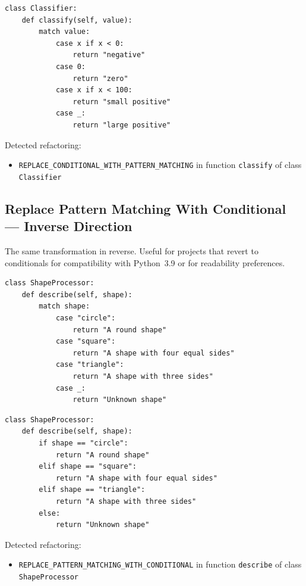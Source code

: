 \documentclass[11pt,a4paper]{article}
\newcommand{\code}[1]{\texttt{#1}}
\begin{document}
\begin{lstlisting}[caption={After: \texttt{match} with guard clauses.}]
class Classifier:
    def classify(self, value):
        match value:
            case x if x < 0:
                return "negative"
            case 0:
                return "zero"
            case x if x < 100:
                return "small positive"
            case _:
                return "large positive"
\end{lstlisting}

Detected refactoring:
\begin{itemize}[leftmargin=*]
  \item \code{REPLACE\_CONDITIONAL\_WITH\_PATTERN\_MATCHING} in function \code{classify} of class \code{Classifier}
\end{itemize}

\subsection{Replace Pattern Matching With Conditional --- Inverse Direction}

The same transformation in reverse. Useful for projects that revert to conditionals for compatibility with Python~3.9 or for readability preferences.

\begin{lstlisting}[caption={Before: \texttt{match}/\texttt{case} dispatch.}]
class ShapeProcessor:
    def describe(self, shape):
        match shape:
            case "circle":
                return "A round shape"
            case "square":
                return "A shape with four equal sides"
            case "triangle":
                return "A shape with three sides"
            case _:
                return "Unknown shape"
\end{lstlisting}

\begin{lstlisting}[caption={After: reverted to \texttt{if}/\texttt{elif}/\texttt{else}.}]
class ShapeProcessor:
    def describe(self, shape):
        if shape == "circle":
            return "A round shape"
        elif shape == "square":
            return "A shape with four equal sides"
        elif shape == "triangle":
            return "A shape with three sides"
        else:
            return "Unknown shape"
\end{lstlisting}

Detected refactoring:
\begin{itemize}[leftmargin=*]
  \item \code{REPLACE\_PATTERN\_MATCHING\_WITH\_CONDITIONAL} in function \code{describe} of class \code{ShapeProcessor}
\end{itemize}
\end{document}

